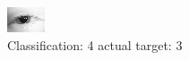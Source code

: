 \begin{figure}[h!]
\begin{center}
\includegraphics[width=0.60\columnwidth]{figures/ID147_class_4_target_3.png}
\end{center}
\caption{ Classification: 4 actual target: 3}
\label{fig:ID147_class_4_target_3}
\end{figure}
